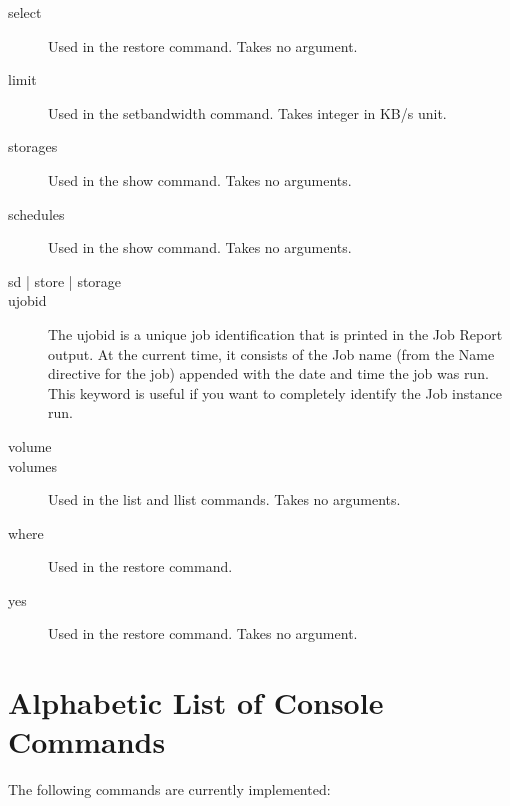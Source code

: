 \begin{description}
\item [select]
  Used in the restore command. Takes no argument.
\item[limit]
  Used in the setbandwidth command. Takes integer in KB/s unit.
\item [storages]
  Used in the show command. Takes no arguments.
\item [schedules]
  Used in the show command. Takes no arguments.
\item [sd | store | storage]
\item [ujobid]
  The ujobid is a unique job identification that is printed
  in the Job Report output. At the current time, it consists
  of the Job name (from the Name directive for the job) appended
  with the date and time the job was run. This keyword is useful
  if you want to completely identify the Job instance run.
\item [volume]
\item [volumes]
  Used in the list and llist commands. Takes no arguments.
\item [where]
  Used in the restore command.
\item [yes]
  Used in the restore command. Takes no argument.
\end{description}

\label{list}
\section{Alphabetic List of Console Commands}

The following commands are currently implemented: 

